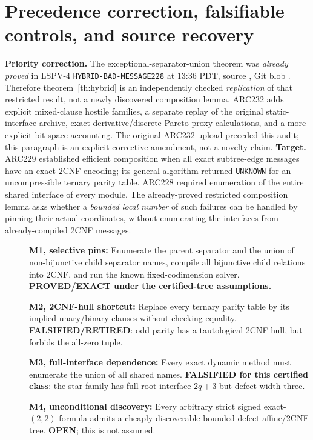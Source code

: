 \documentclass[10pt]{article}
\begin{document}
\section{Precedence correction, falsifiable controls, and source recovery}\noindent\textbf{Priority correction.} The exceptional-separator-union theorem was \emph{already proved} in LSPV-4 \texttt{HYBRID-BAD-MESSAGE228} at 13:36 PDT, source , Git blob \texttt{}. Therefore theorem~\ref{th:hybrid} is an independently checked \emph{replication} of that restricted result, not a newly discovered composition lemma. ARC232 adds explicit mixed-clause hostile families, a separate replay of the original static-interface archive, exact derivative/discrete Pareto proxy calculations, and a more explicit bit-space accounting. The original ARC232 upload preceded this audit; this paragraph is an explicit corrective amendment, not a novelty claim.
\noindent\textbf{Target.} ARC229 established efficient composition when all exact subtree-edge messages have an exact 2CNF encoding; its general algorithm returned \texttt{UNKNOWN} for an uncompressible ternary parity table. ARC228 required enumeration of the entire shared interface of every module. The already-proved restricted composition lemma asks whether a \emph{bounded local number} of such failures can be handled by pinning their actual coordinates, without enumerating the interfaces from already-compiled 2CNF messages.
\begin{description}
\item[] \textbf{M1, selective pins:} Enumerate the parent separator and the union of non-bijunctive child separator names, compile all bijunctive child relations into 2CNF, and run the known fixed-codimension solver. \textbf{PROVED/EXACT under the certified-tree assumptions.}
\item[] \textbf{M2, 2CNF-hull shortcut:} Replace every ternary parity table by its implied unary/binary clauses without checking equality. \textbf{FALSIFIED/RETIRED}: odd parity has a tautological 2CNF hull, but forbids the all-zero tuple.
\item[] \textbf{M3, full-interface dependence:} Every exact dynamic method must enumerate the union of all shared names. \textbf{FALSIFIED for this certified class}: the star family has full root interface $2q+3$ but defect width three.
\item[] \textbf{M4, unconditional discovery:} Every arbitrary strict signed exact-$(2,2)$ formula admits a cheaply discoverable bounded-defect affine/2CNF tree. \textbf{OPEN}; this is not assumed.
\end{description}
\end{document}
